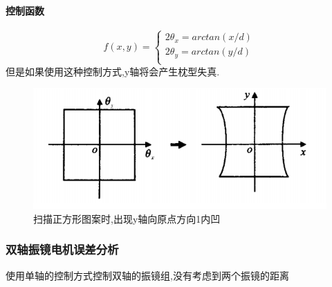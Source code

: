 \documentclass[a4paper,12pt,onecolumn,twoside]{article}
\begin{document}
\paragraph{控制函数}
\begin{equation}
f(x,y)=
\left\{
\begin{array}{c}
2\theta_x = arctan(x/d)  \\
2\theta_y =  arctan(y/d) \\
\end{array}
\right.
\end{equation}
但是如果使用这种控制方式,y轴将会产生枕型失真.
\begin{figure}[htbp]
\includegraphics[width=\linewidth]{MG5.png}
\caption{扫描正方形图案时,出现y轴向原点方向1内凹}
\end{figure}
\newpage
\subsubsection{双轴振镜电机误差分析}
使用单轴的控制方式控制双轴的振镜组,没有考虑到两个振镜的距离
\end{document}
